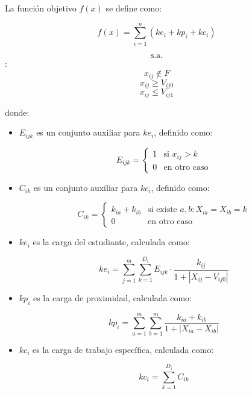 \documentclass{article}
\begin{document}
La función objetivo $f(x)$ se define como:

\[
f(x) = \sum_{i=1}^{n} (ke_i + kp_i + kc_i)
\]

$$\text{s.a.}$$:
$$x_{ij}\notin F$$
$$x_{ij} \geq V_{ij0}$$
$$x_{ij} \leq V_{ij1}$$

donde:

\begin{itemize}
\item $E_{ijk}$ es un conjunto auxiliar para $ke_i$, definido como:

\[
E_{ijk} = 
\begin{cases} 
1 & \text{si } x_{ij} > k \\
0 & \text{en otro caso}
\end{cases}
\]

\item $C_{ik}$ es un conjunto auxiliar para $kc_i$, definido como:

\[
C_{ik} = 
\begin{cases} 
k_{ia} + k_{ib} & \text{si existe } a, b : X_{ia} = X_{ib} = k \\
0 & \text{en otro caso}
\end{cases}
\]

\item $ke_i$ es la carga del estudiante, calculada como:

\[
ke_i = \sum_{j=1}^{m} \sum_{k=1}^{D_i} E_{ijk} \cdot \frac{k_{ij}}{1 + |X_{ij} - V_{ij0}|}
\]

\item $kp_i$ es la carga de proximidad, calculada como:

\[
kp_i = \sum_{a=1}^{m} \sum_{b=1}^{m} \frac{k_{ia} + k_{ib}}{1 + |X_{ia} - X_{ib}|}
\]

\item $kc_i$ es la carga de trabajo específica, calculada como:

\[
kc_i = \sum_{k=1}^{D_i} C_{ik}
\]

\end{itemize}
\end{document}
